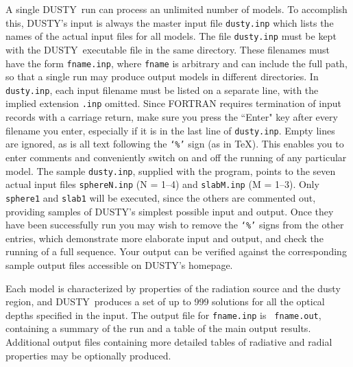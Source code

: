 \documentclass[11pt]{article}
\def\D  {{\sf DUSTY}}
\begin{document}
A single \D\ run can process an unlimited number of models.  To accomplish
this, \D's input is always the master input file {\tt dusty.inp} which lists
the names of the actual input files for all models. The file {\tt dusty.inp}
must be kept with the \D\ executable file in the same directory. These
filenames must have the form {\tt fname.inp}, where {\tt fname} is arbitrary
and can include the full path, so that a single run may produce output models
in different directories. In {\tt dusty.inp}, each input filename must be
listed on a separate line, with the implied extension {\tt .inp} omitted. Since
FORTRAN requires termination of input records with a carriage return, make sure
you press the ``Enter" key after every filename you enter, especially if it is
in the last line of {\tt dusty.inp}. Empty lines are ignored, as is all text
following the {\tt `\%'} sign (as in \TeX).  This enables you to enter comments
and conveniently switch on and off the running of any particular model.  The
sample {\tt dusty.inp}, supplied with the program, points to the seven actual
input files {\tt sphereN.inp} (N = 1--4) and {\tt slabM.inp} (M = 1--3). Only
{\tt sphere1} and {\tt slab1} will be executed, since the others are commented
out, providing samples of \D's simplest possible input and output. Once they
have been successfully run you may wish to remove the {\tt `\%'} signs from the
other entries, which demonstrate more elaborate input and output, and check the
running of a full sequence. Your output can be verified against the
corresponding sample output files accessible on \D's homepage.

Each model is characterized by properties of the radiation source and the dusty
region, and \D\ produces a set of up to 999 solutions for all the optical
depths specified in the input.  The output file for {\tt fname.inp} is {\tt
fname.out}, containing a summary of the run and a table of the main output
results. Additional output files containing more detailed tables of radiative
and radial properties may be optionally produced.
\end{document}
